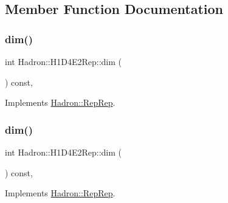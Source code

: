 \subsection{Member Function Documentation}
\mbox{\label{structHadron_1_1H1D4E2Rep_a01e217ac021a9f606e9cc27e4c62389e}} 
\subsubsection{\texorpdfstring{dim()}{dim()}\hspace{0.1cm}{\footnotesize\ttfamily [1/5]}}
{\footnotesize\ttfamily int Hadron\+::\+H1\+D4\+E2\+Rep\+::dim (\begin{DoxyParamCaption}{ }\end{DoxyParamCaption}) const\hspace{0.3cm}{\ttfamily [inline]}, {\ttfamily [virtual]}}



Implements \mbox{\hyperlink{structHadron_1_1RepRep_a92c8802e5ed7afd7da43ccfd5b7cd92b}{Hadron\+::\+Rep\+Rep}}.

\mbox{\label{structHadron_1_1H1D4E2Rep_a01e217ac021a9f606e9cc27e4c62389e}} 
\subsubsection{\texorpdfstring{dim()}{dim()}\hspace{0.1cm}{\footnotesize\ttfamily [2/5]}}
{\footnotesize\ttfamily int Hadron\+::\+H1\+D4\+E2\+Rep\+::dim (\begin{DoxyParamCaption}{ }\end{DoxyParamCaption}) const\hspace{0.3cm}{\ttfamily [inline]}, {\ttfamily [virtual]}}



Implements \mbox{\hyperlink{structHadron_1_1RepRep_a92c8802e5ed7afd7da43ccfd5b7cd92b}{Hadron\+::\+Rep\+Rep}}.

\mbox{\label{structHadron_1_1H1D4E2Rep_a01e217ac021a9f606e9cc27e4c62389e}} 
